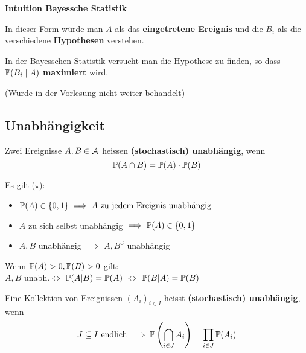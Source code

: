 \textbf{Intuition Bayessche Statistik}

In dieser Form würde man $A$ als das \textbf{eingetretene Ereignis} und die $B_i$ als die verschiedene \textbf{Hypothesen} verstehen. 

In der Bayesschen Statistik versucht man die Hypothese zu finden, so dass $\P(B_i\mid A)$ \textbf{maximiert} wird.

(Wurde in der Vorlesung nicht weiter behandelt)
\subsection{Unabhängigkeit} 
\begin{mainbox}{}
    Zwei Ereignisse $A, B \in \A$ heissen \textbf{(stochastisch) unabhängig}, wenn 
    $$\P(A\cap B) = \P(A) \cdot \P(B)$$
\end{mainbox}
Es gilt ($\star$):
\begin{itemize}
    \item $\P(A) \in \{0, 1\} \implies A \text{ zu jedem Ereignis unabhängig}$
    \item $A$ zu sich selbst unabhängig $\implies \P(A) \in \{0,1\}$
    \item $A, B$ unabhängig $\implies$ $A, B^\complement$ unabhängig
\end{itemize}
Wenn $\P(A) > 0, \P(B) > 0$ gilt:\\
 $A,B$ unabh.$\iff$ $\P(A|B)=\P(A)$ $\iff$ $\P(B|A)=\P(B)$

\begin{mainbox}{}
    Eine Kollektion von Ereignissen $\left(A_i\right)_{i \in I}$ heisst \textbf{(stochastisch) unabhängig}, wenn 
    $$J \subseteq I \text{ endlich} \implies \P\left(\bigcap_{i\in J} A_i\right) = \prod_{i \in J} \P(A_i)$$
\end{mainbox}

